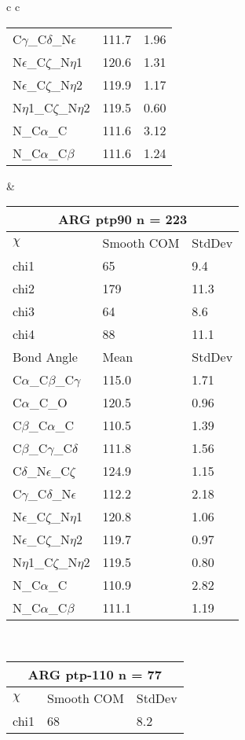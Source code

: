 \begin{longtable}{ c c }
\begin{tabular}{ l l l }
  C$\gamma$\_C$\delta$\_N$\epsilon$ & 111.7 & 1.96\\
  N$\epsilon$\_C$\zeta$\_N$\eta$1 & 120.6 & 1.31\\
  N$\epsilon$\_C$\zeta$\_N$\eta$2 & 119.9 & 1.17\\
  N$\eta$1\_C$\zeta$\_N$\eta$2 & 119.5 & 0.60\\
  N\_C$\alpha$\_C & 111.6 & 3.12\\
  N\_C$\alpha$\_C$\beta$ & 111.6 & 1.24\\
  \bottomrule
  \end{tabular}
  &
  \begin{tabular}{ l l l }
  \toprule
  \multicolumn{3}{c}{ARG \textbf{ptp90} n = 223} \\ \toprule
  $\chi$       & Smooth COM & StdDev \\ \midrule
  chi1 & 65 & 9.4 \\ 
  chi2 & 179 & 11.3 \\ 
  chi3 & 64 & 8.6 \\ 
  chi4 & 88 & 11.1 \\ \midrule
  Bond Angle   & Mean     & StdDev \\ \midrule
  C$\alpha$\_C$\beta$\_C$\gamma$ & 115.0 & 1.71\\
  C$\alpha$\_C\_O & 120.5 & 0.96\\
  C$\beta$\_C$\alpha$\_C & 110.5 & 1.39\\
  C$\beta$\_C$\gamma$\_C$\delta$ & 111.8 & 1.56\\
  C$\delta$\_N$\epsilon$\_C$\zeta$ & 124.9 & 1.15\\
  C$\gamma$\_C$\delta$\_N$\epsilon$ & 112.2 & 2.18\\
  N$\epsilon$\_C$\zeta$\_N$\eta$1 & 120.8 & 1.06\\
  N$\epsilon$\_C$\zeta$\_N$\eta$2 & 119.7 & 0.97\\
  N$\eta$1\_C$\zeta$\_N$\eta$2 & 119.5 & 0.80\\
  N\_C$\alpha$\_C & 110.9 & 2.82\\
  N\_C$\alpha$\_C$\beta$ & 111.1 & 1.19\\
  \bottomrule
  \end{tabular}
  \\
  \begin{tabular}{ l l l }
  \toprule
  \multicolumn{3}{c}{ARG \textbf{ptp-110} n = 77} \\ \toprule
  $\chi$       & Smooth COM & StdDev \\ \midrule
  chi1 & 68 & 8.2 \\ 

\end{tabular}
\end{longtable}
